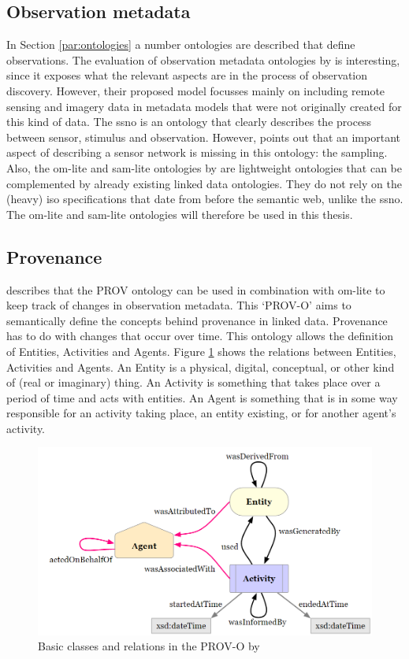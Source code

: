 \subsection{Observation metadata}
In Section \ref{par:ontologies} a number ontologies are described that define observations. The evaluation of observation metadata ontologies by \cite{SW:Hu} is interesting, since it exposes what the relevant aspects are in the process of observation discovery. However, their proposed model focusses mainly on including remote sensing and imagery data in metadata models that were not originally created for this kind of data. The \ac{ssno} is an ontology that clearly describes the process between sensor, stimulus and observation. However, \cite{SSW:Cox4} points out that an important aspect of describing a sensor network is missing in this ontology: the sampling. Also, the om-lite and sam-lite ontologies by \cite{SSW:Cox4} are lightweight ontologies that can be complemented by already existing linked data ontologies. They do not rely on the (heavy) \ac{iso} specifications that date from before the semantic web, unlike the \ac{ssno}. The om-lite and sam-lite ontologies will therefore be used in this thesis. 

\subsection{Provenance}
\cite{SSW:Cox4} describes that the PROV ontology can be used in combination with om-lite to keep track of changes in observation metadata. This `PROV-O' aims to semantically define the concepts behind provenance in linked data. Provenance has to do with changes that occur over time. This ontology allows the definition of Entities, Activities and Agents. Figure \ref{fig:PROV} shows the relations between  Entities, Activities and Agents. An Entity is a physical, digital, conceptual, or other kind of (real or imaginary) thing. An Activity is something that takes place over a period of time and acts with entities. An Agent is something that is in some way responsible for an activity taking place, an entity existing, or for another agent's activity. 

\begin{figure}
	\centering
	\includegraphics[width=1\linewidth]{UML/PROV.png}
	\caption{Basic classes and relations in the PROV-O by \citep{LD:PROV}}
	\label{fig:PROV}
\end{figure}

